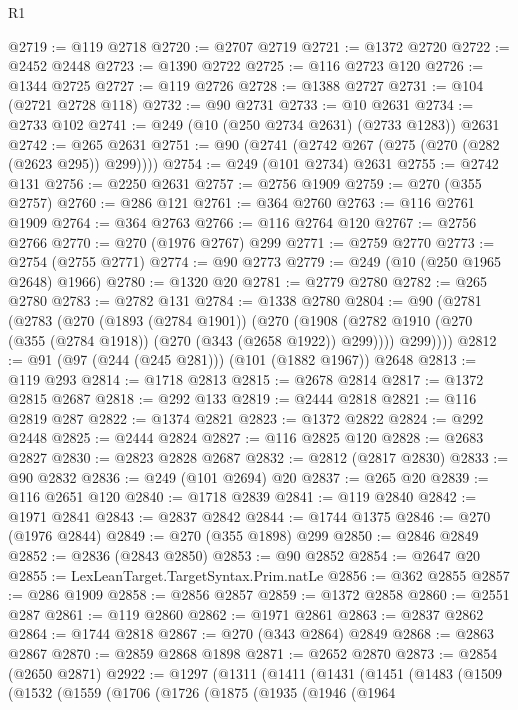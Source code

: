 \begin{lexlean}{R1}
\begin{coremodule}
@2719 := @119 @2718
@2720 := @2707 @2719
@2721 := @1372 @2720
@2722 := @2452 @2448
@2723 := @1390 @2722
@2725 := @116 @2723 @120
@2726 := @1344 @2725
@2727 := @119 @2726
@2728 := @1388 @2727
@2731 := @104 (@2721 @2728 @118)
@2732 := @90 @2731
@2733 := @10 @2631
@2734 := @2733 @102
@2741 := @249 (@10 (@250 @2734 @2631) (@2733 @1283)) @2631
@2742 := @265 @2631
@2751 := @90 (@2741 (@2742 @267 (@275 (@270 (@282 (@2623 @295)) @299))))
@2754 := @249 (@101 @2734) @2631
@2755 := @2742 @131
@2756 := @2250 @2631
@2757 := @2756 @1909
@2759 := @270 (@355 @2757)
@2760 := @286 @121
@2761 := @364 @2760
@2763 := @116 @2761 @1909
@2764 := @364 @2763
@2766 := @116 @2764 @120
@2767 := @2756 @2766
@2770 := @270 (@1976 @2767) @299
@2771 := @2759 @2770
@2773 := @2754 (@2755 @2771)
@2774 := @90 @2773
@2779 := @249 (@10 (@250 @1965 @2648) @1966)
@2780 := @1320 @20
@2781 := @2779 @2780
@2782 := @265 @2780
@2783 := @2782 @131
@2784 := @1338 @2780
@2804 := @90
    (@2781
      (@2783
        (@270
          (@1893 (@2784 @1901))
          (@270
            (@1908 (@2782 @1910 (@270 (@355 (@2784 @1918)) (@270 (@343 (@2658 @1922)) @299))))
            @299))))
@2812 := @91 (@97 (@244 (@245 @281))) (@101 (@1882 @1967)) @2648
@2813 := @119 @293
@2814 := @1718 @2813
@2815 := @2678 @2814
@2817 := @1372 @2815 @2687
@2818 := @292 @133
@2819 := @2444 @2818
@2821 := @116 @2819 @287
@2822 := @1374 @2821
@2823 := @1372 @2822
@2824 := @292 @2448
@2825 := @2444 @2824
@2827 := @116 @2825 @120
@2828 := @2683 @2827
@2830 := @2823 @2828 @2687
@2832 := @2812 (@2817 @2830)
@2833 := @90 @2832
@2836 := @249 (@101 @2694) @20
@2837 := @265 @20
@2839 := @116 @2651 @120
@2840 := @1718 @2839
@2841 := @119 @2840
@2842 := @1971 @2841
@2843 := @2837 @2842
@2844 := @1744 @1375
@2846 := @270 (@1976 @2844)
@2849 := @270 (@355 @1898) @299
@2850 := @2846 @2849
@2852 := @2836 (@2843 @2850)
@2853 := @90 @2852
@2854 := @2647 @20
@2855 := LexLeanTarget.TargetSyntax.Prim.natLe
@2856 := @362 @2855
@2857 := @286 @1909
@2858 := @2856 @2857
@2859 := @1372 @2858
@2860 := @2551 @287
@2861 := @119 @2860
@2862 := @1971 @2861
@2863 := @2837 @2862
@2864 := @1744 @2818
@2867 := @270 (@343 @2864) @2849
@2868 := @2863 @2867
@2870 := @2859 @2868 @1898
@2871 := @2652 @2870
@2873 := @2854 (@2650 @2871)
@2922 := @1297
    (@1311
      (@1411
        (@1431
          (@1451
            (@1483
              (@1509
                (@1532
                  (@1559
                    (@1706
                      (@1726
                        (@1875
                          (@1935
                            (@1946
                              (@1964

\end{coremodule}
\end{lexlean}
